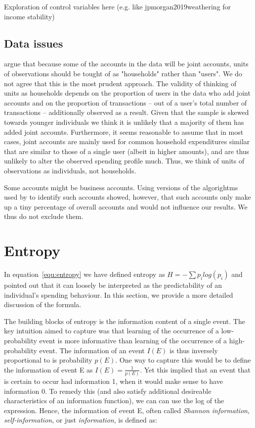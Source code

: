 Exploration of control variables here (e.g. like jpmorgan2019weathering for
income stability)





\subsection{Data issues}%
\label{sub:data_issues}

\citet{bourquin2020effects} argue that because some of the accounts in the data
will be joint accounts, units of observations should be tought of as
"households" rather than "users". We do not agree that this is the most prudent
approach. The validity of thinking of units as households depends on the
proportion of users in the data who add joint accounts and on the proportion of
transactions -- out of a user's total number of transactions -- additionally observed as a
result. Given that the sample is skewed towards younger individuals we think it
is unlikely that a majority of them has added joint accounts. Furthermore, it
seems reasonable to assume that in most cases, joint accounts are mainly used
for common household expenditures similar that are similar to those of a single
user (albeit in higher amounts), and are thus unlikely to alter the observed
spending profile much. Thus, we think of units of observations as individuals,
not households. 

Some accounts might be business accounts. Using versions of the algorightms
used by \citet{bourquin2020effects} to identify such accounts showed, however,
that such accounts only make up a tiny percentage of overall accounts and would
not influence our results. We thus do not exclude them.



\section{Entropy}%
\label{sec:entropy}

In equation~\ref{equ:entropy} we have defined entropy as $H =
-\sum{p_i}log(p_i)$ and pointed out that it can loosely be interpreted as the predictability of an
individual's spending behaviour. In this section, we provide a more detailed
discussion of the formula.

The building blocks of entropy is the information content of a single event.
The key intuition \citet{shannon1948mathematical} aimed to capture was that
learning of the occurrence of a low-probability event is more informative than
learning of the occurrence of a high-probability event. The information of an
event $I(E)$ is thus inversely proportional to is probability $p(E)$. One way
to capture this would be to define the information of event E as $I(E) =
\frac{1}{p(E)}$. Yet this implied that an event that is certain to occur had
information 1, when it would make sense to have information 0. To remedy this
(and also satisfy additional desireable characteristics of an information
function), we can can use the log of the expression. Hence, the information of
event E, often called \textit{Shannon information}, \textit{self-information},
or just \textit{information}, is defined as:

